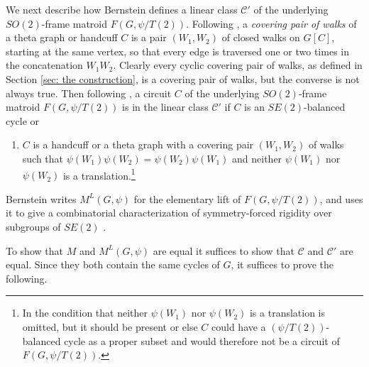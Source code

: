\documentclass[12pt]{article}
\theoremstyle{definition}
\newcommand{\cC}{\mathcal{C}}
\begin{document}
We next describe how Bernstein defines a linear class $\cC'$ of the underlying $SO(2)$-frame matroid $F(G, \psi/T(2))$.
Following \cite[Definition 5.8]{Bernstein2022}, a \emph{covering pair of walks} of a theta graph or handcuff $C$ is a pair $(W_1, W_2)$ of closed walks on $G[C]$, starting at the same vertex, so that every edge is traversed one or two times in the concatenation $W_1W_2$.
Clearly every cyclic covering pair of walks, as defined in Section \ref{sec: the construction}, is a covering pair of walks, but the converse is not always true.
Then following \cite[Definition 5.8, Lemma 5.9, Lemma 5.16]{Bernstein2022}, a circuit $C$ of the underlying $SO(2)$-frame matroid $F(G, \psi/T(2))$ is in the linear class $\cC'$ if $C$ is an $SE(2)$-balanced cycle or
\begin{enumerate}
    \item[$(*')$] $C$ is a handcuff or a theta graph with a covering pair $(W_1, W_2)$ of walks such that $\psi(W_1)\psi(W_2) = \psi(W_2)\psi(W_1)$ and neither $\psi(W_1)$ nor $\psi(W_2)$ is a translation.\footnote{In \cite[Lemma 5.16]{Bernstein2022} the condition that neither $\psi(W_1)$ nor $\psi(W_2)$ is a translation is omitted, but it should be present or else $C$ could have a $(\psi/T(2))$-balanced cycle as a proper subset and would therefore not be a circuit of $F(G, \psi/T(2))$.}
\end{enumerate} 
Bernstein writes $M^L(G, \psi)$ for the elementary lift of $F(G, \psi/T(2))$, and uses it to give a combinatorial characterization of symmetry-forced rigidity over subgroups of $SE(2)$ \cite[Theorem 5.10]{Bernstein2022}.


To show that $M$ and $M^L(G, \psi)$ are equal it suffices to show that $\cC$ and $\cC'$ are equal.
Since they both contain the same cycles of $G$, it suffices to prove the following.
\end{document}
